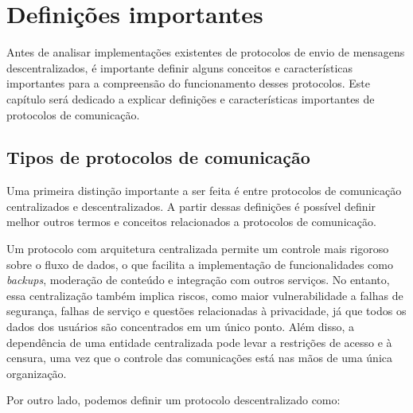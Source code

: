 
\chapter{Definições importantes}

Antes de analisar implementações existentes de protocolos de envio de mensagens descentralizados, é importante definir alguns conceitos e características importantes para a compreensão do funcionamento desses protocolos. Este capítulo será dedicado a explicar definições e características importantes de protocolos de comunicação.

\section{Tipos de protocolos de comunicação}

Uma primeira distinção importante a ser feita é entre protocolos de comunicação centralizados e descentralizados. A partir dessas definições é possível definir melhor outros termos e conceitos relacionados a protocolos de comunicação.


Um protocolo com arquitetura centralizada permite um controle mais rigoroso sobre o fluxo de dados, o que facilita a implementação de funcionalidades como \textit{backups}, moderação de conteúdo e integração com outros serviços. No entanto, essa centralização também implica riscos, como maior vulnerabilidade a falhas de segurança, falhas de serviço e questões relacionadas à privacidade, já que todos os dados dos usuários são concentrados em um único ponto. Além disso, a dependência de uma entidade centralizada pode levar a restrições de acesso e à censura, uma vez que o controle das comunicações está nas mãos de uma única organização.

Por outro lado, podemos definir um protocolo descentralizado como:

